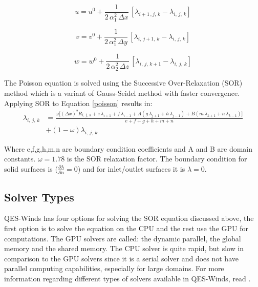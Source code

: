  \begin{equation} \label{eu-lag1}
 u = u^0 + \frac{1}{2\,\alpha_1^2\,\Delta x}\,[\lambda_{i+1\,,j,\,k}-\lambda_{i,\,j,\,k}]
\end{equation}

\begin{equation}
\label{eu-lag2}
 v = v^0 + \frac{1}{2\,\alpha_1^2\,\Delta y}\,[\lambda_{i,\,j+1,\,k}-\lambda_{i,\,j,\,k}]
\end{equation}

\begin{equation}
\label{eu-lag3}
 w = w^0 + \frac{1}{2\,\alpha_2^2\,\Delta z}\,[\lambda_{i,\,j,\,k+1}-\lambda_{i,\,j,\,k}]
\end{equation}

The Poisson equation is solved using the Successive Over-Relaxation (SOR) method which is a variant of Gauss-Seidel method with faster convergence. Applying SOR to Equation \ref{poisson} results in:
\begin{equation}
\label{SOR}
\begin{split}
 \lambda_{i,\,j,\,k} & = \frac{\omega\Bigg[(\Delta x)^2 R_{i,\,j,\,k}+e\,\lambda_{i+1}+f\, \lambda_{i-1}+A(g\,\lambda_{j+1}+h\, \lambda_{j-1}) + B(m\,\lambda_{k+1}+n\, \lambda_{k-1})\Bigg]}{e+f+g+h+m+n}\\
 & +(1-\omega)\lambda_{i,\,j,\,k}
 \end{split}
\end{equation}

Where e,f,g,h,m,n are boundary condition coefficients and A and B are domain constants. $\omega = 1.78$ is the SOR relaxation factor. The boundary condition for solid surfaces is ($\frac{\partial \lambda}{\partial n}=0$) and for inlet/outlet surfaces it is $\lambda=0$.


\subsection{Solver Types}

QES-Winds has four options for solving the SOR equation discussed above, the first option is to solve the equation on the CPU and the rest use the GPU for computations. The GPU solvers are called: the dynamic parallel, the global memory and the shared memory. The CPU solver is quite rapid, but slow in comparison to the GPU solvers since it is a serial solver and does not have parallel computing capabilities, especially for large domains. For more information regarding different types of solvers available in QES-Winds, read \cite{Bozorgmehr2021}.



